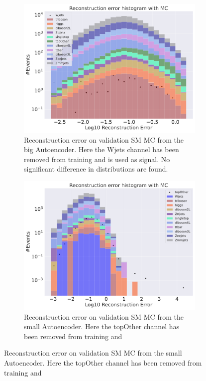 \begin{figure}[H]
\begin{subfigure}{.45\textwidth}
        \includegraphics[width=\textwidth]{Figures/VAE_testing/big/b_data_recon_big_rm3_feats_sig_Wjets.pdf}
        \caption{Reconstruction error on validation SM MC from the big Autoencoder. Here the Wjets channel has been removed from training and 
        is used as signal. No significant difference in distributions are found. }
        \label{fig:vae_big_Wjets}
    \end{subfigure}
    \hfill 
    \begin{subfigure}{.45\textwidth}
        \includegraphics[width=\textwidth]{Figures/VAE_testing/small/b_data_recon_big_rm3_feats_sig_topOther.pdf}
        \caption{Reconstruction error on validation SM MC from the small Autoencoder. Here the topOther channel has been removed from training and 
}
\end{subfigure}
\end{figure}
